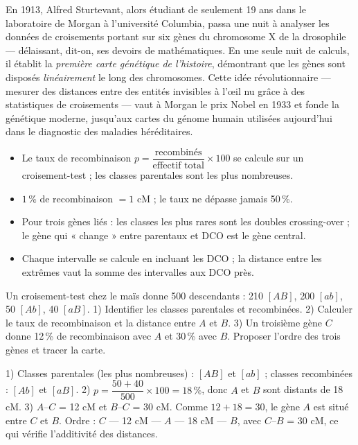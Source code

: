 \documentclass[11pt]{article}
\newcommand{\cle}[1]{{\popxbold\color{popdark}#1}}
\begin{document}
\begin{savaistu}
En 1913, Alfred \cle{Sturtevant}, alors étudiant de seulement 19 ans dans le laboratoire de Morgan à l'université Columbia, passa une nuit à analyser les données de croisements portant sur six gènes du chromosome X de la drosophile — délaissant, dit-on, ses devoirs de mathématiques. En une seule nuit de calculs, il établit la \emph{première carte génétique de l'histoire}, démontrant que les gènes sont disposés \emph{linéairement} le long des chromosomes. Cette idée révolutionnaire — mesurer des distances entre des entités invisibles à l'œil nu grâce à des statistiques de croisements — vaut à Morgan le prix Nobel en 1933 et fonde la génétique moderne, jusqu'aux cartes du génome humain utilisées aujourd'hui dans le diagnostic des maladies héréditaires.
\end{savaistu}

\begin{aretenir}
\begin{itemize}
\item Le taux de recombinaison $p = \dfrac{\text{recombinés}}{\text{effectif total}} \times 100$ se calcule sur un croisement-test ; les classes parentales sont les plus nombreuses.
\item $1\,\%$ de recombinaison $= 1$ cM ; le taux ne dépasse jamais 50\,\%.
\item Pour trois gènes liés : les classes les plus rares sont les doubles crossing-over ; le gène qui « change » entre parentaux et DCO est le gène central.
\item Chaque intervalle se calcule en incluant les DCO ; la distance entre les extrêmes vaut la somme des intervalles aux DCO près.
\end{itemize}
\end{aretenir}

\begin{exercice}
Un croisement-test chez le maïs donne 500 descendants : 210 $[AB]$, 200 $[ab]$, 50 $[Ab]$, 40 $[aB]$. 1) Identifier les classes parentales et recombinées. 2) Calculer le taux de recombinaison et la distance entre $A$ et $B$. 3) Un troisième gène $C$ donne 12\,\% de recombinaison avec $A$ et 30\,\% avec $B$. Proposer l'ordre des trois gènes et tracer la carte.
\end{exercice}

\begin{corrige}
1) Classes parentales (les plus nombreuses) : $[AB]$ et $[ab]$ ; classes recombinées : $[Ab]$ et $[aB]$.
2) $p = \dfrac{50 + 40}{500} \times 100 = 18\,\%$, donc $A$ et $B$ sont distants de 18 cM.
3) $A$--$C$ = 12 cM et $B$--$C$ = 30 cM. Comme $12 + 18 = 30$, le gène $A$ est situé entre $C$ et $B$. Ordre : $C$ --- 12 cM --- $A$ --- 18 cM --- $B$, avec $C$--$B$ = 30 cM, ce qui vérifie l'additivité des distances.
\end{corrige}
\end{document}
